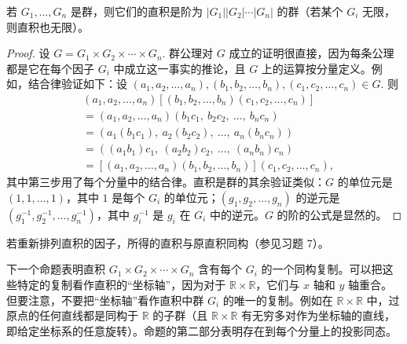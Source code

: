 \begin{proposition}\label{pro:5.1}
若 \(G_1, \ldots, G_n\) 是群，则它们的直积是阶为 \(|G_1||G_2|\cdots|G_n|\) 的群（若某个 \(G_i\) 无限，则直积也无限）。
\end{proposition}

\begin{proof}
设 \(G = G_1 \times G_2 \times \cdots \times G_n\). 群公理对 \(G\) 成立的证明很直接，因为每条公理都是它在每个因子 \(G_i\) 中成立这一事实的推论，且 \(G\) 上的运算按分量定义。例如，结合律验证如下：设 \((a_1, a_2, \ldots, a_n), (b_1, b_2, \ldots, b_n), (c_1, c_2, \ldots, c_n) \in G\). 则
\[
\begin{aligned}
&(a_1, a_2, \ldots, a_n)\left[(b_1, b_2, \ldots, b_n)(c_1, c_2, \ldots, c_n)\right] \\
&=(a_1, a_2, \ldots, a_n)(b_1c_1,\ b_2c_2,\ \ldots,\ b_nc_n) \\
&=(a_1(b_1c_1),\ a_2(b_2c_2),\ \ldots,\ a_n(b_nc_n)) \\
&=((a_1b_1)c_1,\ (a_2b_2)c_2,\ \ldots,\ (a_nb_n)c_n) \\
&=\left[(a_1, a_2, \ldots, a_n)(b_1, b_2, \ldots, b_n)\right](c_1, c_2, \ldots, c_n),
\end{aligned}
\]
其中第三步用了每个分量中的结合律。直积是群的其余验证类似：\(G\) 的单位元是 \((1, 1, \ldots, 1)\)，其中 \(1\) 是每个 \(G_i\) 的单位元；\((g_1, g_2, \ldots, g_n)\) 的逆元是 \((g_1^{-1}, g_2^{-1}, \ldots, g_n^{-1})\)，其中 \(g_i^{-1}\) 是 \(g_i\) 在 \(G_i\) 中的逆元。\(G\) 的阶的公式是显然的。
\end{proof}

若重新排列直积的因子，所得的直积与原直积同构（参见习题 7）。

下一个命题表明直积 \(G_1 \times G_2 \times \cdots \times G_n\) 含有每个 \(G_i\) 的一个同构复制。可以把这些特定的复制看作直积的“坐标轴”，因为对于 \(\mathbb{R} \times \mathbb{R}\)，它们与 \(x\) 轴和 \(y\) 轴重合。但要注意，不要把“坐标轴”看作直积中群 \(G_i\) 的唯一的复制。例如在 \(\mathbb{R} \times \mathbb{R}\) 中，过原点的任何直线都是同构于 \(\mathbb{R}\) 的子群（且 \(\mathbb{R} \times \mathbb{R}\) 有无穷多对作为坐标轴的直线，即给定坐标系的任意旋转）。命题的第二部分表明存在到每个分量上的投影同态。

